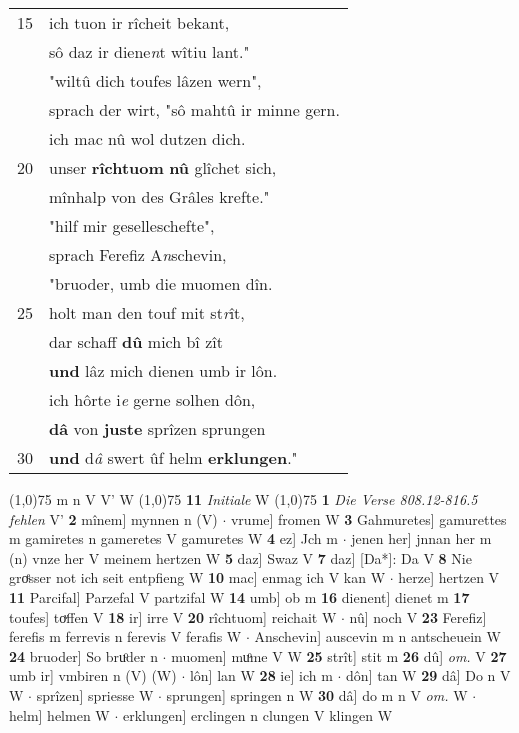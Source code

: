 \documentclass[8pt,a4paper,notitlepage]{article}
\begin{document}
\begin{table}[ht]
\begin{minipage}[t]{0.5\linewidth}
\begin{tabular}{rl}
15 & ich tuon ir rîcheit bekant,\\ 
 & sô daz ir diene\textit{n}t wîtiu lant."\\ 
 & "wiltû dich toufes lâzen wern",\\ 
 & sprach der wirt, "sô mahtû ir minne gern.\\ 
 & ich mac nû wol dutzen dich.\\ 
20 & unser \textbf{rîchtuom} \textbf{nû} glîchet sich,\\ 
 & mînhalp von des Grâles krefte."\\ 
 & "hilf mir geselleschefte",\\ 
 & sprach Ferefiz A\textit{n}schevin,\\ 
 & "bruoder, umb die muomen dîn.\\ 
25 & holt man den touf mit st\textit{r}ît,\\ 
 & dar schaff \textbf{dû} mich bî zît\\ 
 & \textbf{und} lâz mich dienen umb ir lôn.\\ 
 & ich hôrte i\textit{e} gerne solhen dôn,\\ 
 & \textbf{dâ} von \textbf{juste} sprîzen sprungen\\ 
30 & \textbf{und} d\textit{â} swert ûf helm \textbf{erklungen}."\\ 
\end{tabular}
\scriptsize
\line(1,0){75} \newline
m n V V' W \newline
\line(1,0){75} \newline
\textbf{11} \textit{Initiale} W  \newline
\line(1,0){75} \newline
\textbf{1} \textit{Die Verse 808.12-816.5 fehlen} V'  \textbf{2} mînem] mynnen n (V)  $\cdot$ vrume] fromen W \textbf{3} Gahmuretes] gamurettes m gamiretes n gameretes V gamuretes W \textbf{4} ez] Jch m  $\cdot$ jenen her] jnnan her m (n) vnze her V meinem hertzen W \textbf{5} daz] Swaz V \textbf{7} daz] [Da*]: Da V \textbf{8} Nie groͤsser not ich seit entpfieng W \textbf{10} mac] enmag ich V kan W  $\cdot$ herze] hertzen V \textbf{11} Parcifal] Parzefal V partzifal W \textbf{14} umb] ob m \textbf{16} dienent] dienet m \textbf{17} toufes] toͮffen V \textbf{18} ir] irre V \textbf{20} rîchtuom] reichait W  $\cdot$ nû] noch V \textbf{23} Ferefiz] ferefis m ferrevis n ferevis V ferafis W  $\cdot$ Anschevin] auscevin m n antscheuein W \textbf{24} bruoder] So bruͦder n  $\cdot$ muomen] muͦme V W \textbf{25} strît] stit m \textbf{26} dû] \textit{om.} V \textbf{27} umb ir] vmbiren n (V) (W)  $\cdot$ lôn] lan W \textbf{28} ie] ich m  $\cdot$ dôn] tan W \textbf{29} dâ] Do n V W  $\cdot$ sprîzen] spriesse W  $\cdot$ sprungen] springen n W \textbf{30} dâ] do m n V \textit{om.} W  $\cdot$ helm] helmen W  $\cdot$ erklungen] erclingen n clungen V klingen W \newline
\end{minipage}
\end{table}
\end{document}
